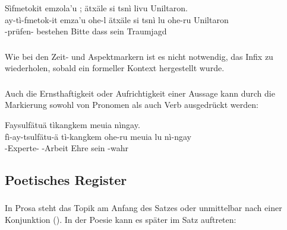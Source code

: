 \begin{interlin}
	\glll \Npawl{}Sìfmetokit emzola'u ; ätxäle si tsnì livu  Uniltaron. \\
	ay-tì-fmetok-it emza'u ohe-l ätxäle si tsnì lu ohe-ru Uniltaron \\
	-prüfen- bestehen  Bitte  dass sein  Traumjagd \\
\end{interlin}

\subsubsection{} Wie bei den Zeit- und Aspektmarkern ist es nicht notwendig, das Infix  zu wiederholen, sobald ein formeller Kontext hergestellt wurde.

\subsubsection{} Auch die Ernsthaftigkeit oder Aufrichtigkeit einer Aussage kann durch die Markierung sowohl von Pronomen als auch Verb ausgedrückt werden:

\begin{interlin}
\glll \Npawl{}Faysulfätuä tìkangkem  meuia  nìngay. \\
      fì-ay-tsulfätu-ä tì-kangkem ohe-ru meuia lu nì-ngay \\
      -Experte- -Arbeit  Ehre sein -wahr \\
\end{interlin}

\subsection{Poetisches Register}

\subsubsection{} In Prosa steht das Topik am Anfang des Satzes oder unmittelbar nach einer Konjunktion (). In der Poesie kann es später im Satz auftreten: 

